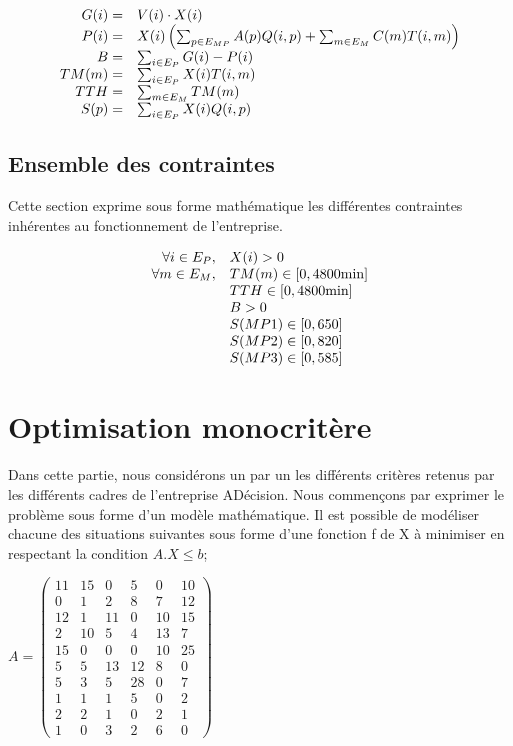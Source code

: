 \documentclass[a4paper, 11pt]{article}
\begin{document}
$$
\begin{array}{r l}
    G(i) =  & V(i)\cdot X(i) \\
    P(i) =  & X(i)\left(\sum_{p\in E_{MP}} A(p)Q(i, p)+ \sum_{m\in E_M} C(m)T(i, m)\right) \\
    B =     & \sum_{i\in E_P} G(i) - P(i) \\
    TM(m) = & \sum_{i\in E_P} X(i)T(i, m) \\
    TTH =   & \sum_{m\in E_M} TM(m) \\
    S(p) =  & \sum_{i\in E_P} X(i)Q(i, p) \\
\end{array}
$$

\subsection{Ensemble des contraintes}
Cette section exprime sous forme mathématique les différentes contraintes
inhérentes au fonctionnement de l'entreprise.

$$
\begin{array}{r l}
    \forall i\in E_P, & X(i) > 0 \\
    \forall m\in E_M, & TM(m) \in [0, 4800\mbox{min}] \\
                      & TTH \in [0, 4800\mbox{min}] \\
                      & B > 0 \\
                      & S(MP1) \in [0, 650] \\
                      & S(MP2) \in [0, 820] \\
                      & S(MP3) \in [0, 585] \\
\end{array}
$$

\section{Optimisation monocritère}
Dans cette partie, nous considérons un par un les différents critères retenus
par les différents cadres de l’entreprise ADécision. Nous commençons par
exprimer le problème sous forme d’un modèle mathématique. Il est possible de
modéliser chacune des situations suivantes sous forme d’une fonction f de X à
minimiser en respectant la condition $A . X \leq b$;

$A = \begin{pmatrix}
11&15&0&5&0&10 \\
0&1&2&8&7&12\\
12&1&11&0&10&15\\
2&10&5&4&13&7\\
15&0&0&0&10&25\\
5&5&13&12&8&0\\
5&3&5&28&0&7\\
1&1&1&5&0&2\\
2&2&1&0&2&1\\
1&0&3&2&6&0
\end{pmatrix}$\\
\end{document}

